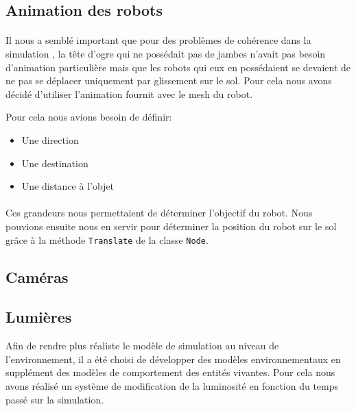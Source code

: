 \subsection{Animation des robots}

\paragraph{}
Il nous a semblé important que pour des problèmes de cohérence dans la
simulation , la tête d'ogre qui ne possédait pas de jambes n'avait pas besoin
d'animation particulière mais que les robots qui eux en possédaient se devaient de
ne pas se déplacer uniquement par glissement sur le sol. Pour cela nous avons
décidé d'utiliser l'animation fournit avec le mesh du robot. 

Pour cela nous avions besoin de définir:\\
\begin{itemize}
  \item Une direction
  \item Une destination
  \item Une distance à l'objet
\end{itemize}

\paragraph{}
Ces grandeurs nous permettaient de déterminer l'objectif du robot. Nous pouvions
ensuite nous en servir pour déterminer la position du robot sur le sol grâce à
la méthode \verb!Translate! de la classe \verb!Node!.

\subsection{Caméras}


\subsection{Lumières}

Afin de rendre plus réaliste le modèle de simulation au niveau de
l'environnement, il a été choisi de développer des modèles environnementaux en
supplément des modèles de comportement des entités vivantes. Pour cela nous
avons réalisé un système de modification de la luminosité en fonction du temps
passé sur la simulation.

